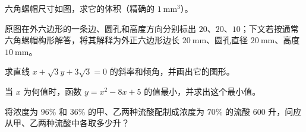 \begin{question}
六角螺帽尺寸如图，求它的体积（精确的 $1\ \mathrm{mm^3}$）。
\nopagebreak[4]
\begin{center}\end{center}
\nopagebreak[4]
\begin{gktip}
原图在外六边形的一条边、圆孔和高度方向分别标出 $20$、$20$、$10$；下文若按通常六角螺帽构形解答，将其解释为外正六边形边长 $20\ \mathrm{mm}$、圆孔直径 $20\ \mathrm{mm}$、高度 $10\ \mathrm{mm}$。
\end{gktip}

\end{question}
\begin{question}
求直线 $x+\sqrt3y+3\sqrt3=0$ 的斜率和倾角，并画出它的图形。

\end{question}
\begin{question}
当 $x$ 为何值时，函数 $y=x^2-8x+5$ 的值最小，并求出这个最小值。

\end{question}
\begin{question}
将浓度为 $96\%$ 和 $36\%$ 的甲、乙两种流酸配制成浓度为 $70\%$ 的流酸 $600$ 升，问应从甲、乙两种流酸中各取多少升？

\end{question}